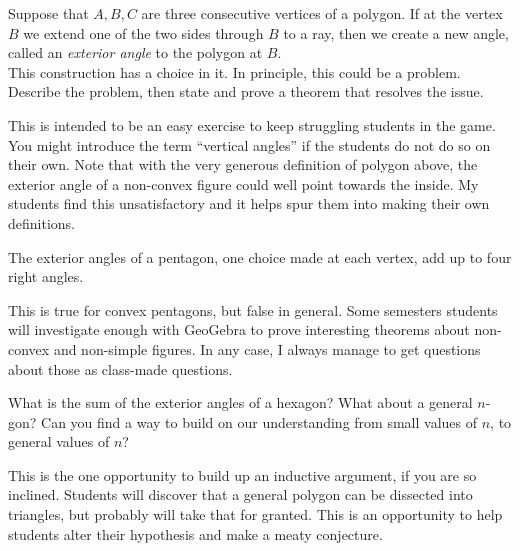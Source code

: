 \begin{problem}\label{prob:exterior-angle}
Suppose that $A,B,C$ are three consecutive vertices of a polygon. 
If at the vertex $B$ we extend one of the two sides through $B$ to a ray, then we create a new angle, called an \emph{exterior angle} to the polygon at $B$.\\
This construction has a choice in it. 
In principle, this could be a problem. 
Describe the problem, then state and prove a theorem that resolves the issue.
\end{problem}

\begin{annotation}
{
\color{blue}
This is intended to be an easy exercise to keep struggling students in the game. You might introduce the term ``vertical angles'' if the students do not do so on their own. Note that with the very generous definition of polygon above, the exterior angle of a non-convex figure could well point towards the inside. My students 
find this unsatisfactory and it helps spur them into making their own definitions.
}
\end{annotation}

\begin{conjecture}\label{conj:ext-angles-pentagon}
The exterior angles of a pentagon, one choice made at each vertex, add up to four right angles.
\end{conjecture}

\begin{annotation}
{
\color{blue}
This is true for convex pentagons, but false in general. Some semesters students will investigate enough with GeoGebra to 
prove interesting theorems about non-convex and non-simple figures. In any case, I always manage to get questions about those as class-made questions.
}
\end{annotation}

\begin{question}\label{question-induction}
What is the sum of the exterior angles of a hexagon? 
What about a general $n$-gon? 
Can you find a way to build on our understanding from small values of $n$, to general values of $n$?
\end{question}

\begin{annotation}
{
\color{blue}
This is the one opportunity to build up an inductive argument, if you are so inclined. Students will discover that a general polygon can be dissected into triangles, but probably will take that for granted. This is an opportunity to help students alter their hypothesis and make a meaty conjecture. 
}
\end{annotation}


